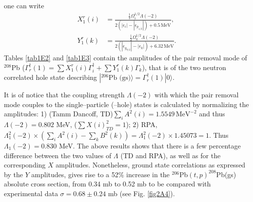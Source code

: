 one can write
\begin{equation*}
\begin{split}
X_1^r(i)&=\frac{\frac{1}{2}\Omega_i^{1/2}\Lambda(-2)}{2(|\epsilon_i|-|\epsilon_{p_{1/2}}|)+0.5\,\text{MeV}},\\ Y_1^r(k)&=\frac{\frac{1}{2}\Omega_k^{1/2}\Lambda(-2)}{2(|\epsilon_{g_{9/2}}|-|\epsilon_k|)+6.32\,\text{MeV}}.
\end{split}
\end{equation*}
Tables \ref{tab1E2} and \ref{tab1E3} contain the amplitudes of the pair removal mode of $^{208}$Pb ($\Gamma^\dagger_r(1)=\sum X^r_{1}(i)\Gamma^\dagger_i+\sum Y^r_{1}(k)\Gamma_k$), that is of the two neutron  correlated hole state describing $|^{206}\text{Pb (gs)}\rangle=\Gamma^\dagger_r(1)|0\rangle$. 


It is of notice that the coupling strength $\Lambda (-2)$ with which the pair removal mode couples to the single--particle (--hole) states is calculated by normalizing the amplitudes: 1) (Tamm Dancoff, TD)$\sum_iA^2(i)=1.5549 \,\text{MeV}^{-2}$ and thus $\Lambda (-2)=0.802$ MeV, ($\sum X(i)^2_{TD}=1$); 2) RPA, $\Lambda_1^2 (-2)\times(\sum_i A^2(i)-\sum_k B^2(k))=\Lambda_1^2(-2)\times1.45073=1$. Thus $\Lambda_1(-2)=0.830$ MeV. The above results shows that there is a few percentage difference between the two values of $\Lambda$ (TD and RPA), as well as for the corresponding $X$ amplitudes. Nonetheless, ground state correlations as expressed by the $Y$ amplitudes, gives rise to a 52\% increase in the $^{206}$Pb$(t,p)^{208}$Pb(gs) absolute cross section, from 0.34 mb to 0.52 mb to be compared with experimental data $\sigma=0.68\pm 0.24$ mb (see Fig. \ref{fig2A4}).


